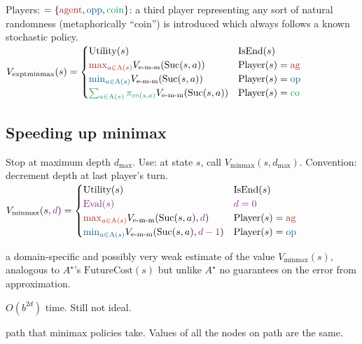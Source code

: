  \textbf{$\text{Players}$}: $ =
\{\agentcolor{\text{agent}}, \oppcolor{\text{opp}},
\chancecolor{\text{coin}}\}$: a third player representing any sort of natural
randomness (metaphorically ``coin'') is introduced which always follows a known
stochastic policy.
$V_{\text{exptminmax}}(s) = \begin{cases}
    \text{Utility}(s) & \text{IsEnd}(s) \\
    \agentcolor{\max_{a \in \text{A}(s)}} V_{\text{e-m-m}}(\text{Suc}(s, a)) & \text{Player}(s) = \agentcolor{\text{ag}} \\
    \oppcolor{\min_{a \in \text{A}(s)}} V_{\text{e-m-m}}(\text{Suc}(s, a)) & \text{Player}(s) = \oppcolor{\text{op}} \\
    \chancecolor{\sum_{a \in \text{A}(s)} \pi_{\text{co}(s,a)}} V_{\text{e-m-m}}(\text{Suc}(s, a)) & \text{Player}(s) = \chancecolor{\text{co}}
\end{cases}$

\subsection*{Speeding up minimax}

 Stop at maximum depth $d_{\text{max}}$. Use:
at state $s$, call $V_{\text{minmax}}(s, d_{\text{max}})$. Convention: decrement
depth at last player's turn.
$V_{\text{minmax}}(s, \dcolor{d}) = \begin{cases}
    \text{Utility}(s) & \text{IsEnd}(s) \\
    \dcolor{\text{Eval}(s)} & \dcolor{d = 0}\\
    \agentcolor{\max_{a \in \text{A}(s)}} V_{\text{e-m-m}}(\text{Suc}(s, a), \dcolor{d}) & \text{Player}(s) = \agentcolor{\text{ag}} \\
    \oppcolor{\min_{a \in \text{A}(s)}} V_{\text{e-m-m}}(\text{Suc}(s, a), \dcolor{d-1}) & \text{Player}(s) = \oppcolor{\text{op}} \\
\end{cases}$

 a domain-specific and possibly very weak estimate of
the value $V_{\text{minmax}}(s)$, analogous to $A^\star$'s
$\text{FutureCost}(s)$ but unlike $A^\star$ no guarantees on the error from
approximation.

 $O(b^{2d})$ time. Still not ideal.

 path that minimax policies take. Values of all the nodes on
path are the same.

